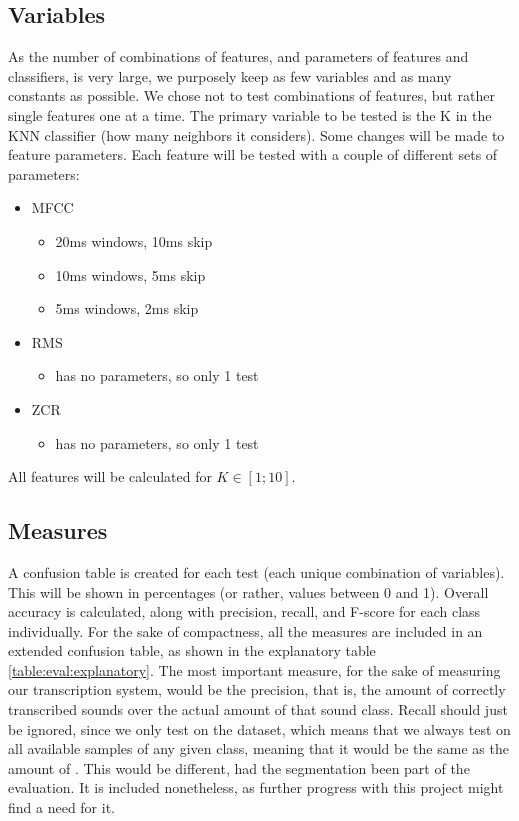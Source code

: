 	\subsection{Variables}
		As the number of combinations of features, and parameters of features and classifiers, is very large, we purposely keep as few variables and as many constants as possible. We chose not to test combinations of features, but rather single features one at a time.
		The primary variable to be tested is the K in the KNN classifier (how many neighbors it considers). Some changes will be made to feature parameters. Each feature will be tested with a couple of different sets of parameters:
		
		\begin{itemize}
			\item MFCC
				\begin{itemize}
					\item 20ms windows, 10ms skip
					\item 10ms windows, 5ms skip
					\item 5ms windows, 2ms skip
				\end{itemize}
			
			\item RMS
				\begin{itemize}
					\item has no parameters, so only 1 test
				\end{itemize}
				
			\item ZCR
				\begin{itemize}
					\item has no parameters, so only 1 test
				\end{itemize}
		
		\end{itemize}
		
		All features will be calculated for $K \in [1;10]$.


	\subsection{Measures}
		A confusion table is created for each test (each unique combination of variables). This will be shown in percentages (or rather, values between 0 and 1). Overall accuracy is calculated, along with precision, recall, and F-score for each class individually. For the sake of compactness, all the measures are included in an extended confusion table, as shown in the explanatory table \ref{table:eval:explanatory}. 
		The most important measure, for the sake of measuring our transcription system, would be the precision, that is, the amount of correctly transcribed sounds over the actual amount of that sound class.
		Recall should just be ignored, since we only test on the dataset, which means that we always test on all available samples of any given class, meaning that it would be the same as the amount of . This would be different, had the segmentation been part of the evaluation. It is included nonetheless, as further progress with this project might find a need for it.

